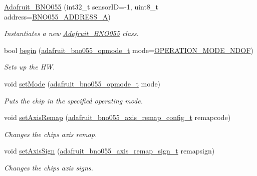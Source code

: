 \begin{DoxyCompactItemize}
\item 
\hyperlink{classAdafruit__BNO055_a8aa7f36e4a0c4040c453ab55899bdd87}{Adafruit\+\_\+\+B\+N\+O055} (int32\+\_\+t sensor\+ID=-\/1, uint8\+\_\+t address=\hyperlink{Adafruit__BNO055_8h_ac3cdd930d950b35e2041e394d5f44693}{B\+N\+O055\+\_\+\+A\+D\+D\+R\+E\+S\+S\+\_\+A})
\begin{DoxyCompactList}\small\item\em Instantiates a new \hyperlink{classAdafruit__BNO055}{Adafruit\+\_\+\+B\+N\+O055} class. \end{DoxyCompactList}\item 
bool \hyperlink{classAdafruit__BNO055_aeea25ebb2984c57ffd1292e87ba336cb}{begin} (\hyperlink{classAdafruit__BNO055_a1288643630f474aba977e4b1aa34456f}{adafruit\+\_\+bno055\+\_\+opmode\+\_\+t} mode=\hyperlink{classAdafruit__BNO055_a1288643630f474aba977e4b1aa34456fa6ff2e99593b4ccefa7315c08df794405}{O\+P\+E\+R\+A\+T\+I\+O\+N\+\_\+\+M\+O\+D\+E\+\_\+\+N\+D\+OF})
\begin{DoxyCompactList}\small\item\em Sets up the HW. \end{DoxyCompactList}\item 
void \hyperlink{classAdafruit__BNO055_a899d247370c86febc01ca431eabac3f4}{set\+Mode} (\hyperlink{classAdafruit__BNO055_a1288643630f474aba977e4b1aa34456f}{adafruit\+\_\+bno055\+\_\+opmode\+\_\+t} mode)
\begin{DoxyCompactList}\small\item\em Puts the chip in the specified operating mode. \end{DoxyCompactList}\item 
void \hyperlink{classAdafruit__BNO055_ae0bdc276735792dd219c6dfe041d9d91}{set\+Axis\+Remap} (\hyperlink{classAdafruit__BNO055_a14148c0000d1f13e4438c6dca1e386f2}{adafruit\+\_\+bno055\+\_\+axis\+\_\+remap\+\_\+config\+\_\+t} remapcode)
\begin{DoxyCompactList}\small\item\em Changes the chip\textquotesingle{}s axis remap. \end{DoxyCompactList}\item 
void \hyperlink{classAdafruit__BNO055_ad154221f5c790321a978c74d6af92e2d}{set\+Axis\+Sign} (\hyperlink{classAdafruit__BNO055_a2456a57a97fb940f07b08319580b2e2f}{adafruit\+\_\+bno055\+\_\+axis\+\_\+remap\+\_\+sign\+\_\+t} remapsign)
\begin{DoxyCompactList}\small\item\em Changes the chip\textquotesingle{}s axis signs. \end{DoxyCompactList}\item 

\end{DoxyCompactItemize}
